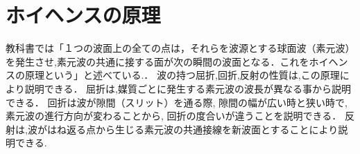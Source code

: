 \documentclass[a4j,twocolumn,uplatex]{jarticle}
\begin{document}
\section{ホイヘンスの原理}
教科書では「１つの波面上の全ての点は，それらを波源とする球面波（素元波）を発生させ,素元波の共通に接する面が次の瞬間の波面となる．これをホイヘンスの原理という」と述べている.\cite{kyoukasyo}．
波の持つ屈折,回折,反射の性質は,この原理により説明できる．
屈折は,媒質ごとに発生する素元波の波長が異なる事から説明できる．
回折は波が隙間（スリット）を通る際,
隙間の幅が広い時と狭い時で,素元波の進行方向が変わることから,
回折の度合いが違うことを説明できる．
反射は,波がはね返る点から生じる素元波の共通接線を新波面とすることにより説明できる.
\vspace{-6mm}

\begin{figure}[htbp]

\end{figure}
\end{document}
